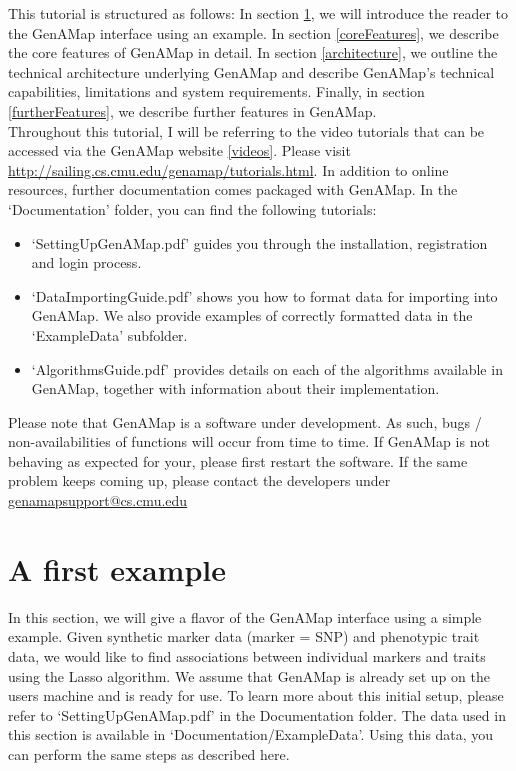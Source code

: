 \documentclass{article}
\begin{document}
This tutorial is structured as follows: In section \ref{example}, we will introduce the reader to the GenAMap interface using an example. In section \ref{coreFeatures}, we describe the core features of GenAMap in detail. In section \ref{architecture}, we outline the technical architecture underlying GenAMap and describe GenAMap's technical capabilities, limitations and system requirements. Finally, in section \ref{furtherFeatures}, we describe further features in GenAMap.\\

Throughout this tutorial, I will be referring to the video tutorials that can be accessed via the GenAMap website \ref{videos}. Please visit \url{http://sailing.cs.cmu.edu/genamap/tutorials.html}. In addition to online resources, further documentation comes packaged with GenAMap. In the `Documentation' folder, you can find the following tutorials:

\begin{itemize}
\item `SettingUpGenAMap.pdf' guides you through the installation, registration and login process.
\item `DataImportingGuide.pdf' shows you how to format data for importing into GenAMap. We also provide examples of correctly formatted data in the `ExampleData' subfolder.
\item `AlgorithmsGuide.pdf' provides details on each of the algorithms available in GenAMap, together with information about their implementation.
\end{itemize}

Please note that GenAMap is a software under development. As such, bugs / non-availabilities of functions will occur from time to time. If GenAMap is not behaving as expected for your, please first restart the software. If the same problem keeps coming up, please contact the developers under \url{genamapsupport@cs.cmu.edu}




\section{A first example} \label{example}

In this section, we will give a flavor of the GenAMap interface using a simple example. Given synthetic marker data (marker = SNP) and phenotypic trait data, we would like to find associations between individual markers and traits using the Lasso algorithm. We assume that GenAMap is already set up on the users machine and is ready for use. To learn more about this initial setup, please refer to `SettingUpGenAMap.pdf' in the Documentation folder. The data used in this section is available in `Documentation/ExampleData'. Using this data, you can perform the same steps as described here.\\
\end{document}
